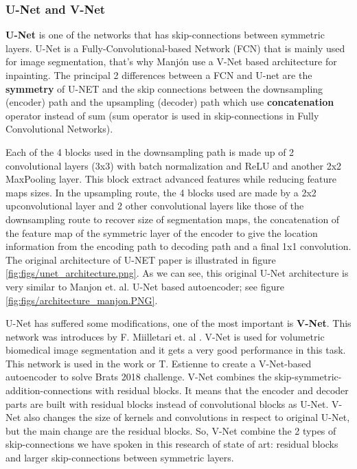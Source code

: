 \subsubsection{U-Net and V-Net}

\textbf{U-Net} \cite{ronneberger2015unet} is one of the networks that has skip-connections between symmetric layers. U-Net is a Fully-Convolutional-based Network (FCN) that is mainly used for image segmentation, that's why Manjón \cite{2020inpainting} use a V-Net based architecture for inpainting. The principal 2 differences between a FCN and U-net are the \textbf{symmetry} of U-NET and the skip connections between the downsampling (encoder) path and the upsampling (decoder) path which use \textbf{concatenation} operator instead of sum (sum operator is used in skip-connections in Fully Convolutional Networks).

Each of the 4 blocks used in the downsampling path is made up of 2 convolutional layers (3x3) with batch normalization and ReLU and another 2x2 MaxPooling layer. This block extract advanced features while reducing feature maps sizes. In the upsampling route, the 4 blocks used are made by a 2x2 upconvolutional layer and 2 other convolutional layers like those of the downsampling route to recover size of segmentation maps, the concatenation of the feature map of the symmetric layer of the encoder to give the location information from the encoding path to decoding path and a final 1x1 convolution. The original architecture of U-NET paper is illustrated in figure \ref{fig:figs/unet_architecture.png}. As we can see, this original U-Net architecture is very similar to Manjon et. al. U-Net based autoencoder; see figure \ref{fig:figs/architecture_manjon.PNG}.


U-Net has suffered some modifications, one of the most important is \textbf{V-Net}. This network was introduces by F. Miilletari et. al \cite{vnet}. V-Net is used for volumetric biomedical image segmentation and it gets a very good performance in this task. This network is used in the work or T. Estienne \cite{otherBraTS2020} to create a V-Net-based autoencoder to solve Brats 2018 challenge. V-Net combines the skip-symmetric-addition-connections with residual blocks. It means that the encoder and decoder parts are built with residual blocks instead of convolutional blocks as U-Net. V-Net also changes the size of kernels and convolutions in respect to original U-Net, but the main change are the residual blocks. So, V-Net combine the 2 types of skip-connections we have spoken in this research of state of art: residual blocks and larger skip-connections between symmetric layers.


